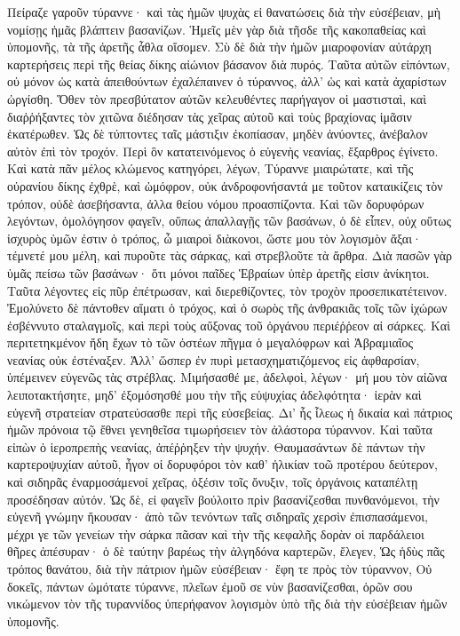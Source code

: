 Πείραζε γαροῦν τύραννε· καὶ τὰς ἡμῶν ψυχὰς εἰ θανατώσεις διὰ τὴν εὐσέβειαν, μὴ νομίσῃς ἡμᾶς βλάπτειν βασανίζων. 
Ἡμεῖς μὲν γὰρ διὰ τῆσδε τῆς κακοπαθείας καὶ ὑπομονῆς, τὰ τῆς ἀρετῆς ἆθλα οἴσομεν. 
Σὺ δὲ διὰ τὴν ἡμῶν μιαροφονίαν αὐτάρχη καρτερήσεις περὶ τῆς θείας δίκης αἰώνιον βάσανον διὰ πυρός. 
Ταῦτα αὐτῶν εἰπόντων, οὐ μόνον ὡς κατὰ ἀπειθούντων ἐχαλέπαινεν ὁ τύραννος, ἀλλ' ὡς καὶ κατὰ ἀχαρίστων ὠργίσθη. 
Ὅθεν τὸν πρεσβύτατον αὐτῶν κελευθέντες παρήγαγον οἱ μαστισταὶ, καὶ διαῤῥήξαντες τὸν χιτῶνα διέδησαν τὰς χεῖρας αὐτοῦ καὶ τοὺς βραχίονας ἱμᾶσιν ἑκατέρωθεν. 
Ὡς δὲ τύπτοντες ταῖς μάστιξιν ἐκοπίασαν, μηδὲν ἀνύοντες, ἀνέβαλον αὐτὸν ἐπὶ τὸν τροχόν. 
Περὶ ὃν κατατεινόμενος ὁ εὐγενὴς νεανίας, ἔξαρθρος ἐγίνετο. 
Καὶ κατὰ πᾶν μέλος κλώμενος κατηγόρει, λέγων, 
Τύραννε μιαιρώτατε, καὶ τῆς οὐρανίου δίκης ἐχθρὲ, καὶ ὠμόφρον, οὐκ ἀνδροφονήσαντά με τοῦτον καταικίζεις τὸν τρόπον, οὐδὲ ἀσεβήσαντα, ἀλλα θείου νόμου προασπίζοντα. 
Καὶ τῶν δορυφόρων λεγόντων, ὁμολόγησον φαγεῖν, οὕπως ἀπαλλαγῇς τῶν βασάνων, 
ὁ δὲ εἶπεν, οὐχ οὕτως ἰσχυρὸς ὑμῶν ἐστιν ὁ τρόπος, ὦ μιαιροὶ διὰκονοι, ὥστε μου τὸν λογισμὸν ἄξαι· τέμνετέ μου μέλη, καὶ πυροῦτε τὰς σάρκας, καὶ στρεβλοῦτε τὰ ἄρθρα. 
Διὰ πασῶν γὰρ ὑμᾶς πείσω τῶν βασάνων· ὅτι μόνοι παῖδες Ἑβραίων ὑπὲρ ἀρετῆς εἰσιν ἀνίκητοι. 
Ταῦτα λέγοντες εἰς πῦρ ἐπέτρωσαν, καὶ διερεθίζοντες, τὸν τροχὸν προσεπικατέτεινον. 
Ἐμολύνετο δὲ πάντοθεν αἵματι ὁ τρόχος, καὶ ὁ σωρὸς τῆς ἀνθρακιᾶς τοῖς τῶν ἰχώρων ἐσβέννυτο σταλαγμοῖς, καὶ περὶ τοὺς αὔξονας τοῦ ὀργάνου περιέῤῥεον αἱ σάρκες. 
Καὶ περιτετηκμένον ἤδη ἔχων τὸ τῶν ὀστέων πῆγμα ὁ μεγαλόφρων καὶ Ἀβραμιαῖος νεανίας οὐκ ἐστέναξεν. 
Ἀλλ' ὥσπερ ἐν πυρὶ μετασχηματιζόμενος εἰς ἀφθαρσίαν, ὑπέμεινεν εὐγενῶς τὰς στρέβλας. 
Μιμήσασθέ με, ἀδελφοὶ, λέγων· μή μου τὸν αἰῶνα λειποτακτήσητε, μηδ' ἐξομόσησθέ μου τὴν τῆς εὐψυχίας ἀδελφότητα· ἱερὰν καὶ εὐγενῆ στρατείαν στρατεύσασθε περὶ τῆς εὐσεβείας. 
Δι' ἧς ἷλεως ἡ δικαία καὶ πάτριος ἡμῶν πρόνοια τῷ ἔθνει γενηθεῖσα τιμωρήσειεν τὸν ἀλάστορα τύραννον. 
Καὶ ταῦτα εἰπὼν ὁ ἱεροπρεπὴς νεανίας, ἀπέῤῥηξεν τὴν ψυχήν. 
Θαυμασάντων δὲ πάντων τὴν καρτεροψυχίαν αὐτοῦ, ἦγον οἱ δορυφόροι τὸν καθ' ἡλικίαν τοῶ προτέρου δεύτερον, καὶ σιδηρᾶς ἐναρμοσάμενοί χεῖρας, ὀξέσιν τοῖς ὄνυξιν, τοῖς ὀργάνοις καταπέλτῃ προσέδησαν αὐτόν. 
Ὡς δὲ, εἰ φαγεῖν βούλοιτο πρὶν βασανίζεσθαι πυνθανόμενοι, τὴν εὐγενῆ γνώμην ἤκουσαν· 
ἀπὸ τῶν τενόντων ταῖς σιδηραῖς χερσὶν ἐπισπασάμενοι, μέχρι γε τῶν γενείων τὴν σάρκα πᾶσαν καὶ τὴν τῆς κεφαλῆς δορὰν οἱ παρδάλειοι θῆρες ἀπέσυραν· ὁ δὲ ταύτην βαρέως τὴν ἀλγηδόνα καρτερῶν, ἔλεγεν, 
Ὡς ἡδὺς πᾶς τρόπος θανάτου, διὰ τὴν πάτριον ἡμῶν εὐσέβειαν· ἔφη τε πρὸς τὸν τύραννον, 
Οὐ δοκεῖς, πάντων ὠμότατε τύραννε, πλεῖων ἐμοῦ σε νὺν βασανίζεσθαι, ὁρῶν σου νικώμενον τὸν τῆς τυραννίδος ὑπερήφανον λογισμὸν ὑπὸ τῆς διὰ τὴν εὐσέβειαν ἡμῶν ὑπομονῆς. 
